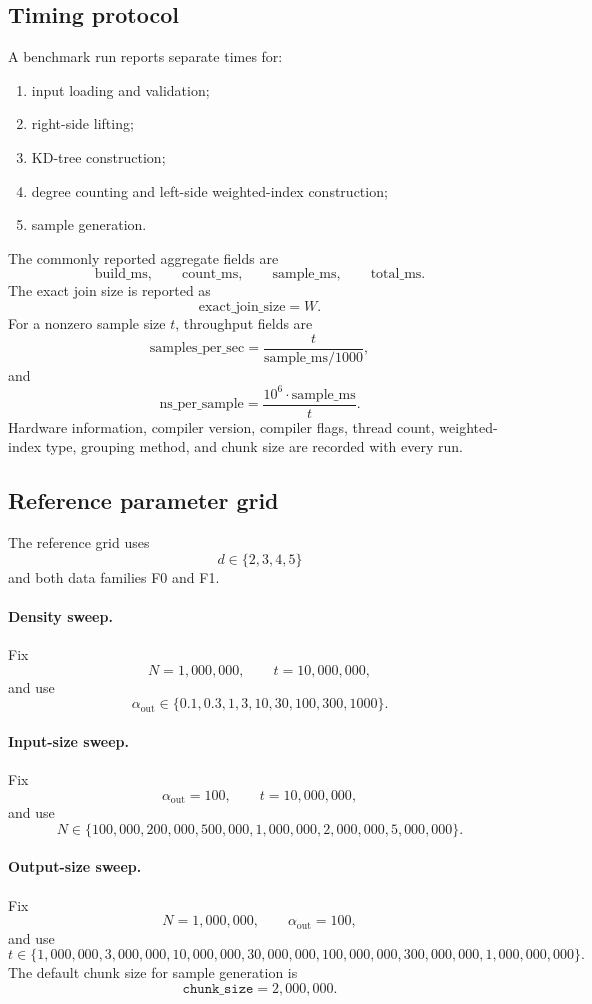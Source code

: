 \documentclass[11pt]{article}
\theoremstyle{definition}
\theoremstyle{plain}
\theoremstyle{remark}
\begin{document}
\subsection{Timing protocol}

A benchmark run reports separate times for:
\begin{enumerate}[leftmargin=2em]
  \item input loading and validation;
  \item right-side lifting;
  \item KD-tree construction;
  \item degree counting and left-side weighted-index construction;
  \item sample generation.
\end{enumerate}
The commonly reported aggregate fields are
\[
  \mathrm{build\_ms},
  \qquad
  \mathrm{count\_ms},
  \qquad
  \mathrm{sample\_ms},
  \qquad
  \mathrm{total\_ms}.
\]
The exact join size is reported as
\[
  \mathrm{exact\_join\_size}=W.
\]
For a nonzero sample size $t$, throughput fields are
\[
  \mathrm{samples\_per\_sec}=\frac{t}{\mathrm{sample\_ms}/1000},
\]
and
\[
  \mathrm{ns\_per\_sample}=\frac{10^6\cdot\mathrm{sample\_ms}}{t}.
\]
Hardware information, compiler version, compiler flags, thread count, weighted-index type,
grouping method, and chunk size are recorded with every run.

\subsection{Reference parameter grid}

The reference grid uses
\[
  d\in\{2,3,4,5\}
\]
and both data families F0 and F1.

\paragraph{Density sweep.}
Fix
\[
  N=1{,}000{,}000,
  \qquad
  t=10{,}000{,}000,
\]
and use
\[
  \alpha_{\mathrm{out}}\in
  \{0.1,0.3,1,3,10,30,100,300,1000\}.
\]

\paragraph{Input-size sweep.}
Fix
\[
  \alpha_{\mathrm{out}}=100,
  \qquad
  t=10{,}000{,}000,
\]
and use
\[
  N\in
  \{100{,}000,200{,}000,500{,}000,1{,}000{,}000,2{,}000{,}000,5{,}000{,}000\}.
\]

\paragraph{Output-size sweep.}
Fix
\[
  N=1{,}000{,}000,
  \qquad
  \alpha_{\mathrm{out}}=100,
\]
and use
\[
  t\in
  \{1{,}000{,}000,3{,}000{,}000,10{,}000{,}000,30{,}000{,}000,
    100{,}000{,}000,300{,}000{,}000,1{,}000{,}000{,}000\}.
\]
The default chunk size for sample generation is
\[
  \texttt{chunk\_size}=2{,}000{,}000.
\]
\end{document}
